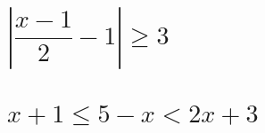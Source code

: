 \documentclass[template=tabling,81pt,headonall]{azmoon}
\begin{document}
\begin{questions}
{\begin{LTR}
\begin{parts}[1]
\part{$|\dfrac{x-1}{2}-1| \geq 3$}
\part{$x+1 \leq 5-x < 2x +3$}
\end{parts}
\end{LTR}
        
    }\end{questions}
    
\end{document}
